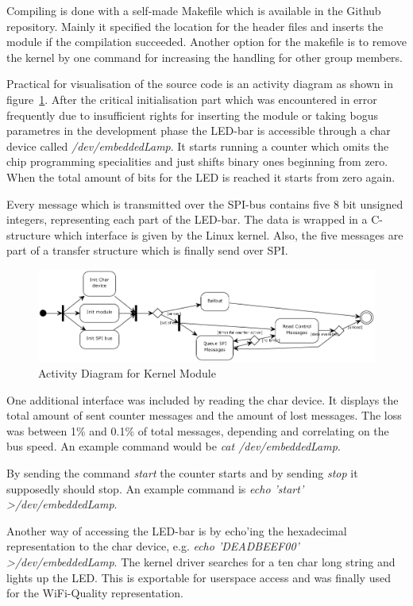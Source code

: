 Compiling is done with a self-made Makefile which is available in the Github repository. Mainly it specified the location for the header files
and inserts the module if the compilation succeeded. Another option for the makefile is to remove the kernel by one command for increasing 
the handling for other group members.

Practical for visualisation of the source code is an activity diagram as shown in figure~\ref{fig:actKernel}. After the critical 
initialisation part which was encountered in error frequently due to insufficient rights for inserting the module or taking bogus parametres
in the development phase the LED-bar is accessible through a char device called \textsl{/dev/embeddedLamp}. It starts running a counter 
which omits the chip programming specialities and just shifts binary ones beginning from zero. When the total amount of bits for the 
LED is reached it starts from zero again.

Every message which is transmitted over the SPI-bus contains five 8 bit unsigned integers, representing each part of the LED-bar. The 
data is wrapped in a C-structure which interface is given by the Linux kernel. Also, the five messages are part of a transfer structure which 
is finally send over SPI.

\begin{figure}[h]
   \centering
   \includegraphics[width=\textwidth]{img/kernel_activity.png}%
   \caption{Activity Diagram for Kernel Module}
   \label{fig:actKernel}%
\end{figure}

One additional interface was included by reading the char device. It displays the total amount of sent counter messages and the amount of 
lost messages. The loss was between 1\% and 0.1\% of total messages, depending and correlating on the bus speed.
An example command would be \textsl{cat /dev/embeddedLamp}.

By sending the command \textsl{start} the counter starts and by sending \textsl{stop} it supposedly should stop. An example command is \textsl{echo 'start' >/dev/embeddedLamp}.

Another way of accessing the LED-bar is by echo'ing the hexadecimal representation to the char device, e.g. \textsl{echo 'DEADBEEF00' >/dev/embeddedLamp}. The kernel driver searches for a ten char long string and lights up the LED. This is exportable for userspace access and was finally used for the WiFi-Quality representation.
